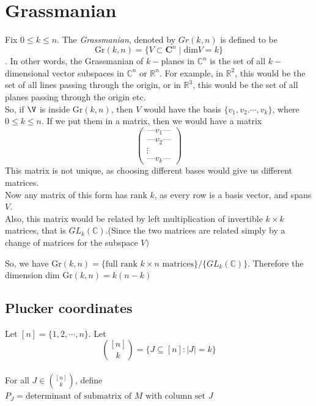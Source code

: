 \documentclass[12pt]{article}
\begin{document}
\section*{Grassmanian}

Fix $0\leq k\leq n$. The \textit{Grassmanian}, denoted by $Gr(k,n)$ is defined to be 
\[
\mathrm{Gr}(k,n)=\{ V \subset \mathbf{C}^n \mid \mathrm{dim}V=k\}
\]
. In other words, the Grassmanian of $k-$planes in $\mathbb{C}^n$ is the set of all $k-$ dimensional vector subspaces in $\mathbb{C}^n$ or $\mathbb{R}^n$. For example, in $\mathbb{R}^2$, this would be the set of all lines passing through the origin, or in $\mathbb{R}^3$, this would be the set of all planes passing through the origin etc.\\

So, if $\V$ is inside $\mathrm{Gr}(k,n)$, then $V$ would have the basis $\{v_1,v_2. \cdots , v_k\}$, where $0\leq k\leq n$. If we put them in a matrix, then we would have a matrix 
\[
\begin{pmatrix}
\text{---} v_1 \text{---} \\
\text{---} v_2 \text{---} \\
\vdots \\
\text{---} v_k \text{---}
\end{pmatrix}
\]
This matrix is not unique, as choosing different bases would give us different matrices.\\

Now any matrix of this form has rank $k$, as every row is a basis vector, and spans $V$.\\
Also, this matrix would be related by left multiplication of invertible $k\times k$ matrices, that is $GL_k(\mathbb{C})$.(Since the two matrices are related simply by a change of matrices for the subspace $V)$

So, we have Gr$(k,n)=\{\text{full rank $k\times n$ matrices}\}/\{GL_k(\mathbb{C})\}$.
Therefore the dimension  dim $\mathrm{Gr}(k,n)=k(n-k)$
\subsection*{Plucker coordinates}
Let $[n]=\{1,2,\cdots,n\}$. Let $$\binom{[n]}{k}=\{J\subseteq [n]: \mid J \mid=k\}$$\\

For all $J \in \binom{[n]}{k}$, define $P_J=\text{determinant of submatrix of $M$ with column set $J$}$
\end{document}
